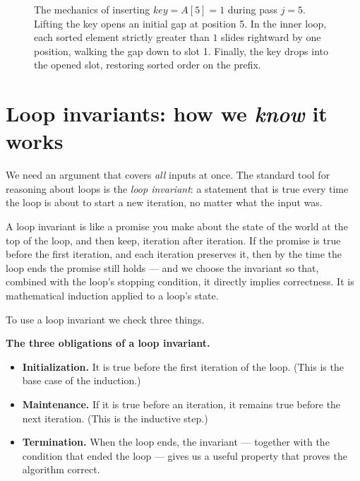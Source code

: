 \begin{figure}[H]
\caption{The mechanics of inserting $\mathit{key} = A[5] = 1$ during pass $j=5$. Lifting
the key opens an initial gap at position 5. In the inner loop, each sorted element
strictly greater than $1$ slides rightward by one position, walking the gap down to
slot 1. Finally, the key drops into the opened slot, restoring sorted order on the prefix.}
\label{ch02:fig-slide}
\end{figure}

\section{Loop invariants: how we \emph{know} it works}

We need an argument that covers \emph{all} inputs at once. The standard
tool for reasoning about loops is the \emph{loop invariant}: a statement that is true
every time the loop is about to start a new iteration, no matter what the input was.

\begin{intuitionbox}
A loop invariant is like a promise you make about the state of the world at the top of
the loop, and then keep, iteration after iteration. If the promise is true before the
first iteration, and each iteration preserves it, then by the time the loop ends the
promise still holds --- and we choose the invariant so that, combined with the loop's
stopping condition, it directly implies correctness. It is mathematical induction
applied to a loop's state.
\end{intuitionbox}

To use a loop invariant we check three things.

\begin{focusbox}
\textbf{The three obligations of a loop invariant.}
\begin{itemize}
  \item \textbf{Initialization.} It is true before the first iteration of the loop.
        (This is the base case of the induction.)
  \item \textbf{Maintenance.} If it is true before an iteration, it remains true before
        the next iteration. (This is the inductive step.)
  \item \textbf{Termination.} When the loop ends, the invariant --- together with the
        condition that ended the loop --- gives us a useful property that proves the
        algorithm correct.
\end{itemize}
\end{focusbox}

